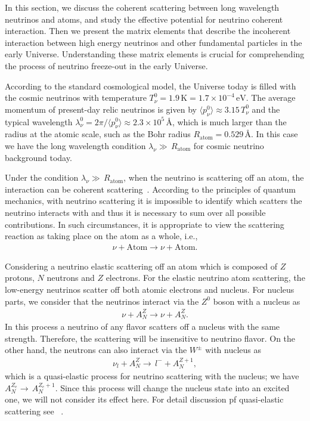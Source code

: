 In this section, we discuss the coherent scattering between long wavelength neutrinos and atoms, and study the effective potential for neutrino coherent interaction. Then we present the matrix elements that describe the incoherent interaction between high energy neutrinos and other fundamental particles in the early Universe. Understanding these matrix elements is crucial for comprehending the process of neutrino freeze-out in the early Universe.

According to the standard cosmological model, the Universe today is filled with the cosmic neutrinos with temperature $T_{\nu}^0=1.9 \,\mathrm{K}=1.7\times10^{-4}\,\mathrm{eV}$. The average momentum of present-day relic neutrinos is given by $\langle p_\nu^0\rangle\approx3.15\,T_\nu^0$ and the typical wavelength $\lambda_{\nu}^{0}={2\pi}/{\langle p_{\nu}^{0}\rangle}\approx2.3\times10^5\,$\AA, which is much larger than the radius at the atomic scale, such as the Bohr radius $R_{\mathrm{atom}}=0.529\,$\AA. In this case we have the long wavelength condition $\lambda_\nu\gg\,R_{\mathrm{atom}}$ for cosmic neutrino background today.  

Under the condition $\lambda_\nu\gg\,R_{\mathrm{atom}}$, when the neutrino is scattering off an atom, the interaction can be coherent scattering~\cite{PhysRevD.38.32,Lewis:1979mu,Papavassiliou:2005cs}. According to the principles of quantum mechanics, with neutrino scattering it is impossible to identify which scatters the neutrino interacts with and thus it is necessary to sum over all possible contributions. In such circumstances, it is appropriate to view the scattering reaction as taking place on the atom as a whole, i.e.,
\begin{align}
\nu+\mathrm{Atom}\longrightarrow\nu+\mathrm{Atom}.
\end{align}

Considering a neutrino elastic scattering off an atom which is composed of $Z$ protons, $N$ neutrons and $Z$ electrons. For the elastic neutrino atom scattering, the low-energy neutrinos scatter off both atomic electrons and nucleus. For nucleus parts, we consider that the neutrinos interact via the $Z^0$ boson with a nucleus as
\begin{align}
\nu+A^{Z}_N\longrightarrow\nu+A^{Z}_N.
\end{align}
In this process a neutrino of any flavor scatters off a nucleus with the same strength. Therefore, the scattering will be insensitive to neutrino flavor. On the other hand, the neutrons can also interact via the $W^\pm$ with nucleus as 
\begin{align}
\nu_l+A^{Z}_N\longrightarrow\,l^-+A^{{Z}+1}_N,
\end{align}
which is a quasi-elastic process for neutrino scattering with the nucleus; we have $A^{Z_e}_N\rightarrow\,A^{{Z_e}+1}_N$. Since this process will change the nucleus state into an excited one, we will not consider its effect here. For detail discussion pf quasi-elastic scattering see ~\cite{SajjadAthar:2022pjt}.

